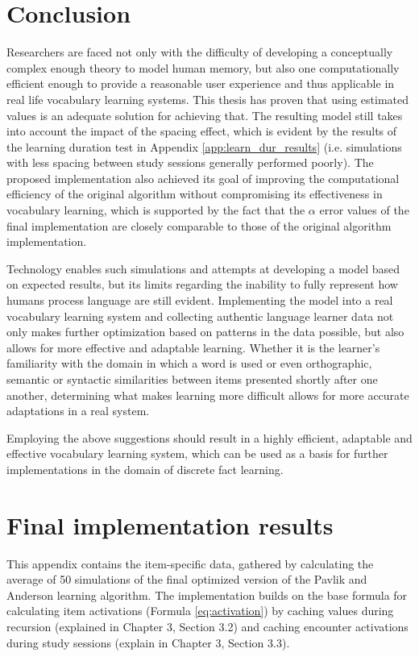 \documentclass[a4paper]{report}
\begin{document}
\chapter{Conclusion}
Researchers are faced not only with the difficulty of developing a conceptually complex enough theory to model human memory, but also one computationally efficient enough to provide a reasonable user experience and thus applicable in real life vocabulary learning systems. This thesis has proven that using estimated values is an adequate solution for achieving that. The resulting model still takes into account the impact of the spacing effect, which is evident by the results of the learning duration test in Appendix \ref{app:learn_dur_results} (i.e. simulations with less spacing between study sessions generally performed poorly). The proposed implementation also achieved its goal of improving the computational efficiency of the original algorithm without compromising its effectiveness in vocabulary learning, which is supported by the fact that the $\alpha$ error values of the final implementation are closely comparable to those of the original algorithm implementation.

Technology enables such simulations and attempts at developing a model based on expected results, but its limits regarding the inability to fully represent how humans process language are still evident. Implementing the model into a real vocabulary learning system and collecting authentic language learner data not only makes further optimization based on patterns in the data possible, but also allows for more effective and adaptable learning. Whether it is the learner's familiarity with the domain in which a word is used or even orthographic, semantic or syntactic similarities between items presented shortly after one another, determining what makes learning more difficult allows for more accurate adaptations in a real system.

Employing the above suggestions should result in a highly efficient, adaptable and effective vocabulary learning system, which can be used as a basis for further implementations in the domain of discrete fact learning.



\appendix

\chapter{Final implementation results}
\label{app:per_word_results}
This appendix contains the item-specific data, gathered by calculating the average of 50 simulations of the final optimized version of the Pavlik and Anderson learning algorithm. The implementation builds on the base formula for calculating item activations (Formula \ref{eq:activation}) by caching values during recursion (explained in Chapter 3, Section 3.2) and caching encounter activations during study sessions (explain in Chapter 3, Section 3.3).
\end{document}
